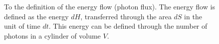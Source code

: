 \begin{figure}
\centering



\caption{To the definition of the energy flow (photon flux). The energy flow
  is defined as the energy $dH$, transferred through the area $dS$ in
  the unit of time $dt$. This energy can be defined through the number
  of photons in a cylinder of volume $V$.}
\label{figPart1Ch2_add1}
\end{figure}